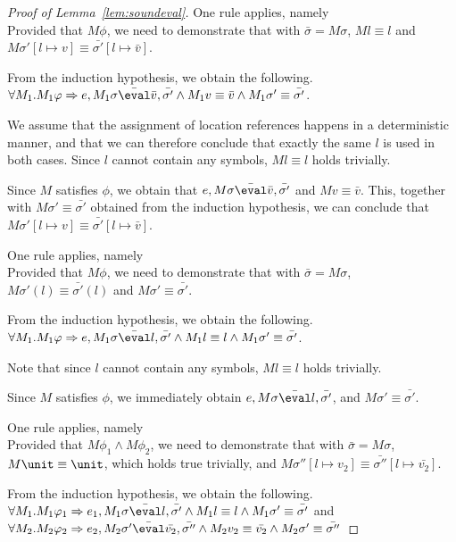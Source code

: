 \begin{proof}[Proof of Lemma~\ref{lem:soundeval}]
  {One rule applies, namely \\
  Provided that $M\phi$,
  we need to demonstrate that  with $\bar{\sigma}=M\sigma$,
  $M l \equiv l$ and $M\sigma'[l\mapsto v]\equiv\bar{\sigma'}[l\mapsto\bar{v}]$.

  From the induction hypothesis, we obtain the following.\\
  $\forall M_1 .  M_1\phi \implies e, M_1\sigma \bar{\eval}\bar{v},\bar{\sigma'}\land  M_1v\equiv \bar{v} \wedge  M_1\sigma'\equiv\bar{\sigma'}$.

  We assume that the assignment of location references happens in a deterministic manner, and that we can therefore conclude that exactly the same $l$ is used in both cases. Since $l$ cannot contain any symbols, $M l \equiv l$ holds trivially.

  Since $M$ satisfies $\phi$,
  we obtain that $e,M\sigma \bar{\eval}\bar{v},\bar{\sigma'}$ and $M v\equiv \bar{v}$.
  This, together with $M \sigma' \equiv\bar{\sigma'}$ obtained from the induction hypothesis, we can conclude that $M\sigma'[l\mapsto v]\equiv\bar{\sigma'}[l\mapsto\bar{v}]$.
  }

  {One rule applies, namely \\
  Provided that $M\phi$, we need to demonstrate that  with $\bar{\sigma}=M\sigma$,
  $M \sigma'(l) \equiv \bar{\sigma'}(l)$ and $M\sigma'\equiv\bar{\sigma'}$.

  From the induction hypothesis, we obtain the following.\\
  $\forall M_1 .  M_1\phi \implies e, M_1\sigma \bar{\eval}l,\bar{\sigma'}\land  M_1l\equiv l \land  M_1\sigma'\equiv\bar{\sigma'}$.

  Note that since $l$ cannot contain any symbols, $M l \equiv l$ holds trivially.

  Since $M$ satisfies $\phi$,
  we immediately obtain $e,M\sigma \bar{\eval}l,\bar{\sigma'}$,
  and $M\sigma'\equiv\bar{\sigma'}$.
}

  {
  One rule applies, namely \\
  Provided that $M\phi_1\wedge M\phi_2$,
  we need to demonstrate that  with $\bar{\sigma}=M\sigma$,
  $M\unit \equiv \unit$, which holds true trivially,
  and $M\sigma''[l\mapsto v_2]\equiv\bar{\sigma''}[l\mapsto\bar{v_2}]$.

  From the induction hypothesis, we obtain the following.\\
  $\forall M_1 .  M_1\phi_1 \implies e_1, M_1\sigma \bar{\eval}l,\bar{\sigma'}\land  M_1 l\equiv l \land  M_1\sigma'\equiv\bar{\sigma'}$ and\\
  $\forall M_2 . M_2\phi_2 \implies e_2,M_2\sigma' \bar{\eval}\bar{v_2},\bar{\sigma''}\land M_2v_2\equiv \bar{v_2} \land M_2\sigma'\equiv\bar{\sigma''}$

}
\end{proof}
